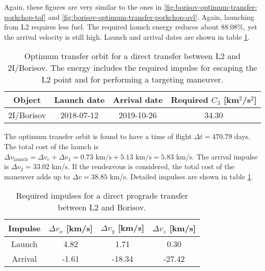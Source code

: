 Again, these figures are very similar to the ones in
\ref{fig:borisov-optimum-transfer-porkchop-tof} and
\ref{fig:borisov-optimum-transfer-porkchop-avl}. Again, launching from L2
requires less fuel. The required launch energy reduces about 88.08\%, yet the
arrival velocity is still high. Launch and arrival dates are shown in table
\ref{tab:l2-borisov-direct-transfer-optimum}.

\vspace{1cm}
\begin{table}[H]
  \centering
  \begin{tabular}{|c|c|c|c|}
    \hline
    Object     & Launch date & Arrival date & Required $C_3$ [km$^2$/s$^2$] \\
    \hline
    2I/Borisov & 2018-07-12  & 2019-10-26   & 34.30                         \\
    \hline
  \end{tabular}
  \caption[Optimum transfer orbit for a direct transfer between L2 and
    2I/Borisov.]{Optimum transfer orbit for a direct transfer between
    L2 and 2I/Borisov. The energy includes the required impulse for
    escaping the L2 point and for performing a targeting maneuver.}
  \label{tab:l2-borisov-direct-transfer-optimum}
\end{table}

The optimum transfer orbit is found to have a time of flight $\Delta t = 470.79$
days. The total cost of the launch is $\Delta v_\text{launch} = \Delta v_e +
  \Delta v_1 = 0.73 \text{ km/s} + 5.13 \text{ km/s} = 5.83$ km/s. The arrival
impulse is $\Delta v_2 = 33.02$ km/s. If the rendezvous is considered, the total
cost of the maneuver adds up to $\Delta v = 38.85$ km/s. Detailed impulses are
shown in table \ref{tab:l2-borisov-direct-transfer-optimum}.

\vspace{1cm}
\begin{table}[H]
  \centering
  \begin{tabular}{|c|c|c|c|}
    \hline
    Impulse & $\Delta v_x$ [km/s] & $\Delta v_y$ [km/s] & $\Delta v_z$ [km/s] \\
    \hline
    Launch  & 4.82                & 1.71                & 0.30                \\
    \hline
    Arrival & -1.61               & -18.34              & -27.42              \\
    \hline
  \end{tabular}
  \caption[Required impulses for a direct prograde transfer between L2 and
    Borisov]{Required impulses for a direct prograde transfer between L2 and
    Borisov.}
  \label{tab:l2-borisov-direct-transfer-impulses}
\end{table}

